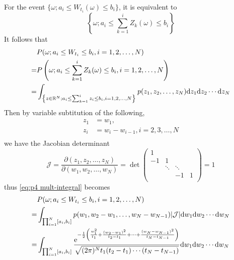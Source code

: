 \documentclass{homework}
\begin{document}
\begin{subproblem}[\roman*)]
        For the event $\{\omega;a_i\leq W_{t_i}(\omega)\leq b_i\}$,
        it is equivalent to
        \[\left\{\omega;a_i\leq \sum_{k=1}^iZ_k(\omega)\leq b_i\right\}\]
        It follows that
        \begin{equation}
            \label{eq:p4 mult-integral}
            \begin{aligned}
            &P(\omega;a_i\leq W_{t_i}\leq b_i,i=1,2,\ldots,N)\\
            =&P\left(\omega;a_i\leq \sum_{k=1}^iZ_k(\omega)\leq b_i,i=1,2,\ldots,N\right)\\
            =&\int_{\left\{z\in\mathbb R^N;a_i\leq\sum_{k=1}^iz_i\leq b_i,i=1,2,\ldots,N\right\}}
              p(z_1,z_2,\ldots,z_N)
              \mathrm d z_1\mathrm d z_2\cdots\mathrm d z_N
            \end{aligned}
        \end{equation}
        Then by variable subtitution of the following,
        \begin{align*}
            z_1&=w_1,\\
            z_i&=w_i-w_{i-1},i=2,3,\ldots,N\\
        \end{align*}
        we have the Jacobian determinant
        \[\mathcal J=
        \frac{\partial(z_1,z_2,\ldots,z_N)}{\partial(w_1,w_2,\ldots,w_N)}
        =\det\begin{pmatrix}
            1  &        &        &       \\
            -1 & 1      &        &       \\
               & \ddots & \ddots &       \\
               &        & -1     & 1     \\
        \end{pmatrix}=1\]
        thus \cref{eq:p4 mult-integral} becomes
        \begin{align*}
            &P(\omega;a_i\leq W_{t_i}\leq b_i,i=1,2,\ldots,N)\\
            =&\int_{\prod_{i=1}^N[a_i,b_i]}
              p(w_1,w_2-w_1,\ldots,w_N-w_{N-1})
              |\mathcal J|
              \mathrm d w_1\mathrm d w_2\cdots\mathrm d w_N\\
            =&\int_{\prod_{i=1}^N[a_i,b_i]}
               \frac{\mathrm e^{-\frac{1}{2}\left(
                   \frac{w_1^2}{t_1} 
                   +\frac{(w_2-w_1)^2}{t_2-t_1}
                   +\cdots
                   +\frac{(w_N-w_{N-1})^2}{t_N-t_{N-1}}
               \right)}}{\sqrt{(2\pi)^Nt_1(t_2-t_1)\cdots(t_N-t_{N-1})}}
              \mathrm d w_1\mathrm d w_2\cdots\mathrm d w_N\\
        \end{align*}


\end{subproblem}
\end{document}
